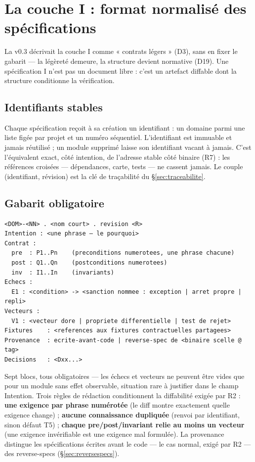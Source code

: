 \section{La couche I : format normalisé des spécifications}\label{sec:coucheI}

La v0.3 décrivait la couche I comme « contrats légers » (D3), sans en fixer le gabarit —
la légèreté demeure, la structure devient normative (D19). Une spécification I n’est pas un
document libre : c’est un artefact diffable dont la structure conditionne la vérification.

\subsection{Identifiants stables}

Chaque spécification reçoit à sa création un identifiant  : un domaine
parmi une liste figée par projet et un numéro séquentiel. L’identifiant est immuable et
jamais réutilisé ; un module supprimé laisse son identifiant vacant à jamais. C’est
l’équivalent exact, côté intention, de l’adresse stable côté binaire (R7) : les références
croisées — dépendances, carte, tests — ne cassent jamais. Le couple (identifiant,
révision) est la clé de traçabilité du §\ref{sec:traceabilite}.

\subsection{Gabarit obligatoire}

\begin{lstlisting}
<DOM>-<NN> . <nom court> . revision <R>
Intention : <une phrase — le pourquoi>
Contrat :
  pre  : P1..Pn    (preconditions numerotees, une phrase chacune)
  post : Q1..Qn    (postconditions numerotees)
  inv  : I1..In    (invariants)
Echecs :
  E1 : <condition> -> <sanction nommee : exception | arret propre | repli>
Vecteurs :
  V1 : <vecteur dore | propriete differentielle | test de rejet>
Fixtures    : <references aux fixtures contractuelles partagees>
Provenance  : ecrite-avant-code | reverse-spec de <binaire scelle @ tag>
Decisions   : <Dxx...>
\end{lstlisting}

Sept blocs, tous obligatoires — les échecs et vecteurs ne peuvent être vides que pour un
module sans effet observable, situation rare à justifier dans le champ Intention. Trois
règles de rédaction conditionnent la diffabilité exigée par R2 : \textbf{une exigence par
phrase numérotée} (le diff montre exactement quelle exigence change) ; \textbf{aucune
connaissance dupliquée} (renvoi par identifiant, sinon défaut T5) ; \textbf{chaque
pre/post/invariant relie au moins un vecteur} (une exigence invérifiable est une exigence
mal formulée). La provenance distingue les spécifications écrites avant le code — le cas
normal, exigé par R2 — des reverse-specs (§\ref{sec:reversespecs}).

